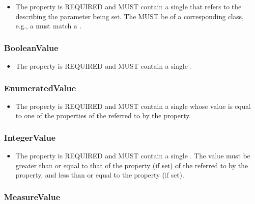 \begin{itemize}
\item \label{sec:valueOf}
The  property is REQUIRED and MUST contain a single  that refers to the  describing the parameter being set.
The  MUST be of a corresponding class, e.g., a  must match a .
\end{itemize}


\subsubsection{BooleanValue}
\label{sec:BooleanValue}

\begin{itemize}
\item \label{sec:BP:value}
The  property is REQUIRED and MUST contain a single .
\end{itemize}

\subsubsection{EnumeratedValue}
\label{sec:EnumeratedValue}

\begin{itemize}
\item \label{sec:EV:value}
The  property is REQUIRED and MUST contain a single  whose value is equal to one of the  properties of the  referred to by the  property.
\end{itemize}


\subsubsection{IntegerValue}
\label{sec:IntegerValue}

\begin{itemize}
\item \label{sec:IV:value}
The  property is REQUIRED and MUST contain a single .
The value must be greater than or equal to that of the  property (if set) of the  referred to by the  property, and less than or equal to the  property (if set).
\end{itemize}

\subsubsection{MeasureValue}
\label{sec:MeasureValue}

